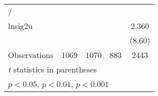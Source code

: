 {\begin{longtable}{l*{4}{c}}
\hline
/               &                  &                  &                  &                  \\
lnsig2u         &                  &                  &                  &    2.360\sym{***}\\
                &                  &                  &                  &   (8.60)         \\
\hline
Observations    &     1069         &     1070         &      883         &     2443         \\
\hline\hline
\multicolumn{5}{l}{\footnotesize \textit{t} statistics in parentheses}\\
\multicolumn{5}{l}{\footnotesize \sym{*} \(p<0.05\), \sym{**} \(p<0.01\), \sym{***} \(p<0.001\)}\\
\end{longtable}
}
